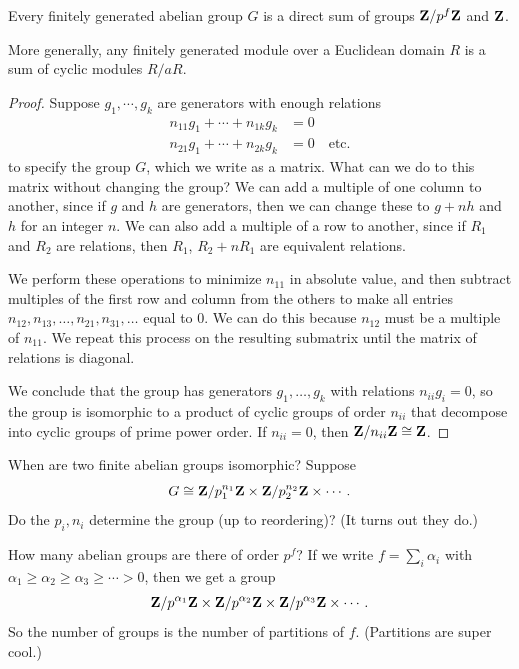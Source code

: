 \documentclass[11pt, twoside]{amsart}
\begin{document}
\begin{theorem}\label{decomp}
Every finitely generated abelian group $G$ is a direct sum of groups $\mathbf{Z}/p^f\mathbf{Z}$ and $\mathbf{Z}$.
\end{theorem}
More generally, any finitely generated module over a Euclidean domain $R$ is a sum of cyclic modules $R/aR$.
\begin{proof}
Suppose $g_1 ,\cdots,g_k$ are generators with enough relations
\begin{align*}
n_{11}g_1 + \cdots + n_{1k} g_k &= 0\\
n_{21} g_1 + \cdots + n_{2k} g_k&=0\quad \mathrm{etc.}
\end{align*}
to specify the group $G$, which we write as a matrix. What can we do to this matrix without changing the group? We can add a multiple of one column to another, since if $g$ and $h$ are generators, then we can change these to $g+nh$ and $h$ for an integer $n$. We can also add a multiple of a row to another, since if $R_1$ and $R_2$ are relations, then $R_1$, $R_2+nR_1$ are equivalent relations.

We perform these operations to minimize $n_{11}$ in absolute value, and then subtract multiples of the first row and column from the others to make all entries $n_{12}, n_{13},\hdots,n_{21}, n_{31} ,\hdots$ equal to $0$. We can do this because $n_{12}$ must be a multiple of $n_{11}$. We repeat this process on the resulting submatrix until the matrix of relations is diagonal.

We conclude that the group has generators $g_1,\hdots,g_k$ with relations $n_{ii} g_i = 0$, so the group is isomorphic to a product of cyclic groups of order $n_{ii}$ that decompose into cyclic groups of prime power order. If $n_{ii} = 0$, then $\mathbf{Z}/n_{ii}\mathbf{Z} \cong \mathbf{Z}$.
\end{proof}

When are two finite abelian groups isomorphic? Suppose 
$$
G \cong \mathbf{Z}/p_1^{n_1}\mathbf{Z} \times \mathbf{Z} /p_2^{n_2}\mathbf{Z} \times \cdots.
$$
Do the $p_i,n_i$ determine the group (up to reordering)? (It turns out they do.) %

How many abelian groups are there of order $p^f$? If we write $f = \sum_i \alpha_i $ with $\alpha_1\ge \alpha_2\ge \alpha_3 \ge \cdots > 0$, then we get a group
$$
\mathbf{Z}/{p^{\alpha_1}}\mathbf{Z} \times \mathbf{Z}/{p^{\alpha_2}}\mathbf{Z} \times \mathbf{Z}/{p^{\alpha_3}}\mathbf{Z}  \times \cdots. 
$$
So the number of groups is the number of partitions of $f$. (Partitions are super cool.)
\end{document}
